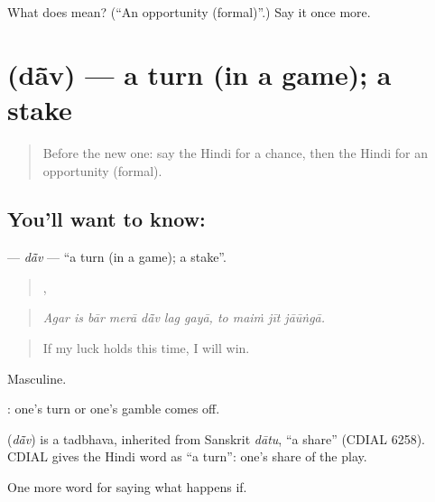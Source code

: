 \begin{tcolorbox}[breakable,colback=teal!4,colframe=teal!35!black,title={Before you move on}]
What does  mean? (\textquotedblleft{}An opportunity (formal)\textquotedblright{}.) Say it once more.
\end{tcolorbox}
\section[\texorpdfstring{\hi{दाँव} (dā̃v)}{दाँव (dā̃v)}]{ (dā̃v) — a turn (in a game); a stake}

\label{lesson:HI-C544-dav}



\begin{quote}
Before the new one: say the Hindi for a chance, then the Hindi for an opportunity (formal).
\end{quote}

\subsection*{You'll want to know: }
\textbf{} — \emph{dā̃v} — \textquotedblleft{}a turn (in a game); a stake\textquotedblright{}.

\begin{quote}
      ,    
\end{quote}

\begin{quote}
\emph{Agar is bār merā dā̃v lag gayā, to maiṁ jīt jāūṅgā.}
\end{quote}

\begin{quote}
If my luck holds this time, I will win.
\end{quote}

Masculine.

 : one's turn or one's gamble comes off.

\begin{cousinweb}
\textbf{} (\emph{dā̃v}) is a tadbhava, inherited from Sanskrit \emph{dātu}, \textquotedblleft{}a share\textquotedblright{} (CDIAL 6258). CDIAL gives the Hindi word as \textquotedblleft{}a turn\textquotedblright{}: one's share of the play.
\end{cousinweb}

\begin{grammarlens}[title={What you've built}]
One more word for saying what happens if.
\end{grammarlens}

